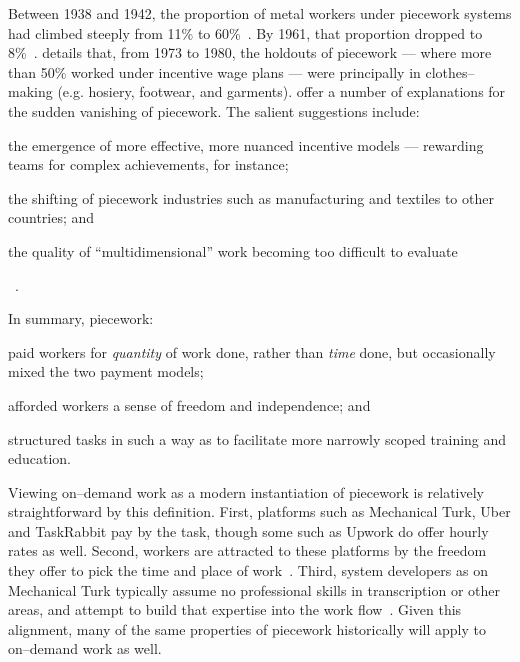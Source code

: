 \documentclass[trackingWork]{subfiles}
\begin{document}
Between 1938 and 1942, the proportion of metal workers under piecework systems had climbed steeply from 11\% to 60\%~\cite{hart2005piecework}.
By 1961, that proportion dropped to 8\%~\cite{carlson1982time}.
\citeauthor{carlson1982time} details that, from 1973 to 1980, the holdouts of piecework
--- where more than 50\% worked under incentive wage plans ---
were principally in clothes--making (e.g. hosiery, footwear, and garments).
\citeauthor{hart2013rise} offer a number of explanations for the sudden vanishing of piecework.
The salient suggestions include:
\begin{inlinelist}
\item the emergence of more effective, more nuanced incentive models
--- rewarding teams for complex achievements, for instance;
\item the shifting of piecework industries such as manufacturing and textiles to other countries; and
\item the quality of ``multidimensional'' work becoming too difficult to evaluate
\end{inlinelist}~\cite{hart2013rise}.



In summary, piecework:
\begin{inlinelist}
  \item paid workers for \textit{quantity} of work done, rather than \textit{time} done,
        but occasionally mixed the two payment models;
  \item afforded workers a sense of freedom and independence; and
  \item structured tasks in such a way as to facilitate more narrowly scoped training and education.
\end{inlinelist}

Viewing on--demand work as a modern instantiation of piecework is relatively straightforward by this definition.
First, platforms such as Mechanical Turk, Uber and TaskRabbit pay by the task, though some such as Upwork do offer hourly rates as well.
Second, workers are attracted to these platforms by the freedom they offer to pick the time and place of work~\cite{martin2014being,whyWouldAnyoneBrewer}.
Third, system developers as on Mechanical Turk typically assume no professional skills in transcription or other areas, and attempt to build that expertise into the work flow~\cite{noronha2011platemate,bernsteinSoylent}.
Given this alignment, many of the same properties of piecework historically will apply to on--demand work as well. 
\end{document}
